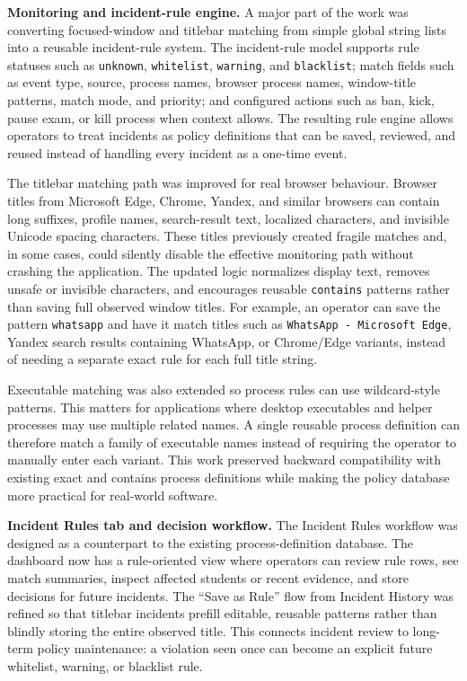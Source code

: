 \textbf{Monitoring and incident-rule engine.} A major part of the work was converting focused-window and titlebar matching from simple global string lists into a reusable incident-rule system. The incident-rule model supports rule statuses such as \texttt{unknown}, \texttt{whitelist}, \texttt{warning}, and \texttt{blacklist}; match fields such as event type, source, process names, browser process names, window-title patterns, match mode, and priority; and configured actions such as ban, kick, pause exam, or kill process when context allows. The resulting rule engine allows operators to treat incidents as policy definitions that can be saved, reviewed, and reused instead of handling every incident as a one-time event.

The titlebar matching path was improved for real browser behaviour. Browser titles from Microsoft Edge, Chrome, Yandex, and similar browsers can contain long suffixes, profile names, search-result text, localized characters, and invisible Unicode spacing characters. These titles previously created fragile matches and, in some cases, could silently disable the effective monitoring path without crashing the application. The updated logic normalizes display text, removes unsafe or invisible characters, and encourages reusable \texttt{contains} patterns rather than saving full observed window titles. For example, an operator can save the pattern \texttt{whatsapp} and have it match titles such as \texttt{WhatsApp - Microsoft Edge}, Yandex search results containing WhatsApp, or Chrome/Edge variants, instead of needing a separate exact rule for each full title string.

Executable matching was also extended so process rules can use wildcard-style patterns. This matters for applications where desktop executables and helper processes may use multiple related names. A single reusable process definition can therefore match a family of executable names instead of requiring the operator to manually enter each variant. This work preserved backward compatibility with existing exact and contains process definitions while making the policy database more practical for real-world software.

\textbf{Incident Rules tab and decision workflow.} The Incident Rules workflow was designed as a counterpart to the existing process-definition database. The dashboard now has a rule-oriented view where operators can review rule rows, see match summaries, inspect affected students or recent evidence, and store decisions for future incidents. The ``Save as Rule'' flow from Incident History was refined so that titlebar incidents prefill editable, reusable patterns rather than blindly storing the entire observed title. This connects incident review to long-term policy maintenance: a violation seen once can become an explicit future whitelist, warning, or blacklist rule.


